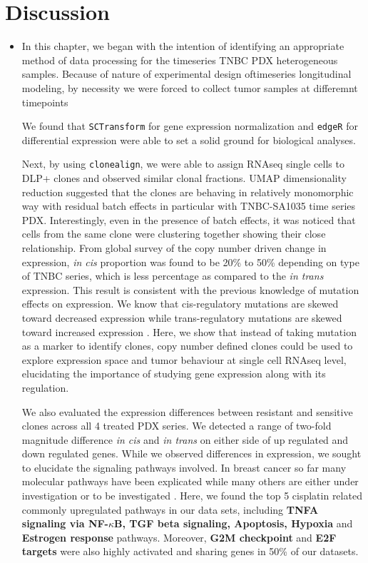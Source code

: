 

\section{Discussion}
\begin{itemize}
  
 \item In this chapter, we began with the intention of identifying an appropriate method of data processing for the timeseries TNBC PDX heterogeneous samples. Because of nature of experimental design oftimeseries longitudinal modeling, by necessity we were forced to collect tumor samples at differemnt timepoints 
 
 We found that \texttt{SCTransform} for gene expression normalization and \texttt{edgeR} for differential expression were able to set a solid ground for biological analyses. 

Next, by using \texttt{clonealign}, we were able to assign RNAseq single cells  to  DLP+ clones and observed similar clonal fractions. \ac{UMAP} dimensionality reduction suggested that the clones are behaving in relatively monomorphic way with residual batch effects in particular with TNBC-SA1035 time series PDX. Interestingly, even in the presence of batch effects, it was noticed that cells from the same clone were clustering together showing their close relationship.
From global survey of the copy number driven change in expression, \textit{in cis} proportion was found to be 20\% to 50\% depending on type of TNBC series, which is less percentage as compared to the \textit{in trans} expression. 
This result is consistent with the previous knowledge of mutation effects on expression. We know that cis-regulatory mutations are skewed toward decreased expression while trans-regulatory mutations are skewed toward increased expression \cite{metzger2016contrasting}. Here, we show that instead of taking mutation as a marker to identify clones, copy number defined clones could be used to explore expression  space and tumor behaviour at single cell RNAseq level, elucidating the importance of studying gene expression along with its regulation.

We also evaluated the expression differences between resistant and sensitive clones across all 4 treated PDX series. We detected a range of two-fold magnitude difference \textit{in cis} and \textit{in trans} on either side of up regulated and down regulated genes. While we observed differences in expression, we sought to elucidate the signaling pathways involved. In breast cancer so far many molecular pathways have been explicated while many others are either under investigation or to be investigated \cite{hanahan2011hallmarks}. Here, we found the top 5 cisplatin related commonly upregulated pathways in our data sets, including \textbf{TNFA signaling via NF-$\kappa$B, TGF  beta  signaling, Apoptosis, Hypoxia} and \textbf{Estrogen response} pathways. Moreover, \textbf{G2M checkpoint} and \textbf{E2F targets} were also highly activated and sharing genes in 50\% of our datasets. 


\end{itemize}
